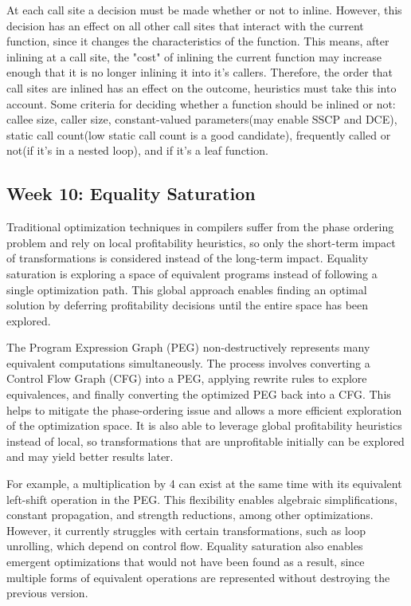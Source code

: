 \documentclass[11pt, a4paper, titlepage]{article}
\begin{document}
At each call site a decision must be made whether or not to inline. However, this decision has an effect on all other call sites that interact with the current function, since it changes the characteristics of the function. This means, after inlining at a call site, the "cost" of inlining the current function may increase enough that it is no longer inlining it into it's callers. Therefore, the order that call sites are inlined has an effect on the outcome, heuristics must take this into account. Some criteria for deciding whether a function should be inlined or not: callee size, caller size, constant-valued parameters(may enable SSCP and DCE), static call count(low static call count is a good candidate), frequently called or not(if it's in a nested loop), and if it's a leaf function.

\subsection{Week 10: Equality Saturation}

Traditional optimization techniques in compilers suffer from the phase ordering problem and rely on local profitability heuristics, so only the short-term impact of transformations is considered instead of the long-term impact.
Equality saturation is exploring a space of equivalent programs instead of following a single optimization path.
This global approach enables finding an optimal solution by deferring profitability decisions until the entire space has been explored.

The Program Expression Graph (PEG) non-destructively represents many equivalent computations simultaneously.
The process involves converting a Control Flow Graph (CFG) into a PEG, applying rewrite rules to explore equivalences, and finally converting the optimized PEG back into a CFG.
This helps to mitigate the phase-ordering issue and allows a more efficient exploration of the optimization space.
It is also able to leverage global profitability heuristics instead of local, so transformations that are unprofitable initially can be explored and may yield better results later.

For example, a multiplication by 4 can exist at the same time with its equivalent left-shift operation in the PEG.
This flexibility enables algebraic simplifications, constant propagation, and strength reductions, among other optimizations.
However, it currently struggles with certain transformations, such as loop unrolling, which depend on control flow.
Equality saturation also enables emergent optimizations that would not have been found as a result, since multiple forms of equivalent operations are represented without destroying the previous version. 
\end{document}
